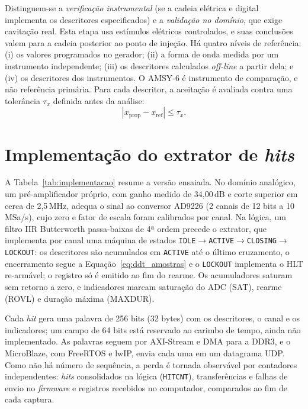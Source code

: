 Distinguem-se a \emph{verificação instrumental} (se a cadeia elétrica e digital implementa os descritores especificados) e a \emph{validação no domínio}, que exige cavitação real. Esta etapa usa estímulos elétricos controlados, e suas conclusões valem para a cadeia posterior ao ponto de injeção. Há quatro níveis de referência: (i) os valores programados no gerador; (ii) a forma de onda medida por um instrumento independente; (iii) os descritores calculados \textit{off-line} a partir dela; e (iv) os descritores dos instrumentos. O AMSY-6 é instrumento de comparação, e não referência primária. Para cada descritor, a aceitação é avaliada contra uma tolerância \(\tau_x\) definida antes da análise:
\begin{equation}
	\left|x_{\mathrm{prop}} - x_{\mathrm{ref}}\right| \leq \tau_x .
	\label{eq:criterio_aceitacao}
\end{equation}

\section{Implementação do extrator de \textit{hits}}
\label{sec:mm_implementacao}

A Tabela~\ref{tab:implementacao} resume a versão ensaiada. No domínio analógico, um pré-amplificador próprio, com ganho medido de 34,00\,dB e corte superior em cerca de 2,5\,MHz, adequa o sinal ao conversor AD9226 (2 canais de 12 bits a 10\,MSa/s), cujo zero e fator de escala foram calibrados por canal. Na lógica, um filtro IIR Butterworth passa-baixas de 4ª ordem precede o extrator, que implementa por canal uma máquina de estados \texttt{IDLE}\(\rightarrow\)\texttt{ACTIVE}\(\rightarrow\)\texttt{CLOSING}\(\rightarrow\)\texttt{LOCKOUT}: os descritores são acumulados em \texttt{ACTIVE} até o último cruzamento, o encerramento segue a Equação~\eqref{eq:ddt_amostras} e o \texttt{LOCKOUT} implementa o HLT re-armável; o registro só é emitido ao fim do rearme. Os acumuladores saturam sem retorno a zero, e indicadores marcam saturação do ADC (SAT), rearme (ROVL) e duração máxima (MAXDUR).

Cada \textit{hit} gera uma palavra de 256 bits (32 bytes) com os descritores, o canal e os indicadores; um campo de 64 bits está reservado ao carimbo de tempo, ainda não implementado. As palavras seguem por AXI-Stream e DMA para a DDR3, e o MicroBlaze, com FreeRTOS e lwIP, envia cada uma em um datagrama UDP. Como não há número de sequência, a perda é tornada observável por contadores independentes: \textit{hits} consolidados na lógica (\texttt{HITCNT}), transferências e falhas de envio no \textit{firmware} e registros recebidos no computador, comparados ao fim de cada captura.

